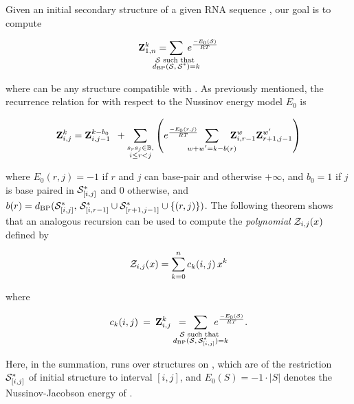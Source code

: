 Given an initial secondary structure \strSt of a
given RNA sequence \seq, our goal is to compute

\begin{align}
\label{eq:fftbor:defZofK}
\bfZ{k}{1,n} = \sum_{\mathclap{\substack{\str \text{ such that }\\ \dBP{\str}{\strSt}=k}}}\;
\boltzNuss{\str}
\end{align}

where \str can be any structure compatible with \seq.
As previously mentioned, the recurrence relation for \rnabor
with respect to the Nussinov energy model $E_0$ is

\begin{align}
\label{eq:fftbor:rnaborNuss}
\bfZ{k}{i,j} = \bfZ{k-b_0}{i,j-1}\enspace +
\sum_{\substack{s_r s_j \in \bpSet, \\ i \le r<j}}
\left(
\boltzNuss{r,j}\enspace \sum_{\mathclap{w+w'=k-b(r)}}\quad
\bfZ{w}{i,r-1} \bfZ{w'}{r+1,j-1}
\right)
\end{align}

where $E_0(r,j)=-1$ if $r$ and $j$ can base-pair and otherwise
$+\infty$, and
$b_0 = 1$ if $j$ is base paired in $\mathcal S^*_{[i,j]}$ and 0 otherwise, and
$b(r)=d_{\text{BP}}(\mathcal S^*_{[i,j]},\,\mathcal S^*_{[i,r-1]} \cup \mathcal S^*_{[r+1,j-1]} \cup\{(r,j)\})$.
The following theorem shows that an analogous recursion can be used to compute
the {\em polynomial} ${\mathcal Z}_{i,j}(x)$ defined by

\begin{align}
\label{eq:fftbor:polynomialZij}
\emZ{i,j} = \sum_{k=0}^n c_k(i,j)\,x^k
\end{align}

where

\begin{align}
c_k(i,j)\>=\>
\bfZ{k}{i,j}\enspace=\enspace
\sum_{\mathclap{\substack{\str \text{ such that } \\
\dBP{\str}{\strSt_{[i,j]}}=k}}}\enspace
\boltzNuss{\str}.
\end{align}

Here, in the summation, \str runs over structures on \seqIJ, which
are \kNbrs of the restriction $\mathcal S^*_{[i,j]}$ of initial structure
\strSt to interval $[i,j]$, and
$E_0(S)=-1 \cdot |S|$ denotes the Nussinov-Jacobson energy of \str.

